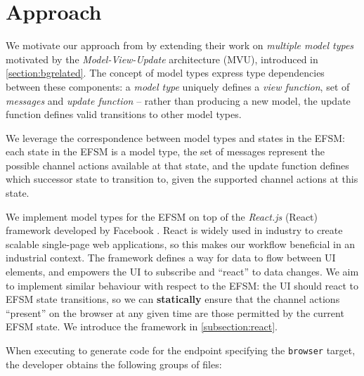\section{Approach}
\label{section:reactapproach}

We motivate our approach from \cite{MVU2020} by extending
their work on \textit{multiple model types} motivated by the
\textit{Model-View-Update} architecture (MVU),
introduced in \cref{section:bgrelated}.
The concept of model types express type dependencies between these
components: a \emph{model type} uniquely defines a \textit{view function},
set of \textit{messages} and \textit{update function} -- rather than
producing a new model, the update function defines valid transitions to
other model types.

We leverage the correspondence between model types 
and states in the EFSM:
each state in the EFSM is a model type, the set of messages represent
the possible channel actions available at that state,
and the update function defines which successor state to transition to,
given the supported channel actions at this state.

We implement model types for the EFSM on top of the 
\emph{React.js} (React) framework developed by Facebook \cite{React}.
React is widely used in industry to create scalable single-page
web applications, so this makes our workflow beneficial in an
industrial context. 
The framework defines a way for data to flow
between UI elements, and empowers the UI to subscribe and
``react'' to data changes.
We aim to implement similar behaviour with respect to the EFSM:
the UI should react to EFSM state transitions,
so we can \textbf{statically} ensure that the
channel actions ``present'' on the browser at any given time
are those permitted by the current EFSM state.
We introduce the framework in \cref{subsection:react}.

When executing  to generate code
for the  endpoint specifying the
\texttt{browser} target, the developer obtains the following 
groups of files:

